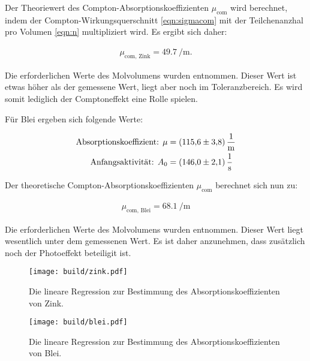 Der Theoriewert des Compton-Absorptionskoeffizienten $\mu_\text{com}$ wird berechnet, indem der Compton-Wirkungsquerschnitt \ref{eqn:sigmacom} mit der Teilchenanzhal pro Volumen \ref{eqn:n} multipliziert wird.
Es ergibt sich daher:

\begin{align*}
  \mu_\text{com, Zink} = \SI{49.7}{\per\metre}.
\end{align*}

Die erforderlichen Werte des Molvolumens wurden \cite{zink} entnommen.
Dieser Wert ist etwas höher als der gemessene Wert, liegt aber noch im Toleranzbereich.
Es wird somit lediglich der Comptoneffekt eine Rolle spielen.

Für Blei ergeben sich folgende Werte:

\begin{align*}
  \text{Absorptionskoeffizient: } \mu &= \SI{115.6 \pm 3.8}{\per\metre} \\
  \text{Anfangsaktivität: } A_0 &= \SI{146.0 \pm 2.1}{\per\second}
\end{align*}

Der theoretische Compton-Absorptionskoeffizienten $\mu_\text{com}$ berechnet sich nun zu:

\begin{align*}
  \mu_\text{com, Blei} = \SI{68.1}{\per\metre}
\end{align*}

Die erforderlichen Werte des Molvolumens wurden \cite{blei} entnommen.
Dieser Wert liegt wesentlich unter dem gemessenen Wert.
Es ist daher anzunehmen, dass zusätzlich noch der Photoeffekt beteiligit ist.

\begin{figure}
  \centering
  \texttt{[image: build/zink.pdf]}
  \caption{Die lineare Regression zur Bestimmung des Absorptionskoeffizienten von Zink.}
  \label{fig:zink1}
\end{figure}

\begin{figure}
  \centering
  \texttt{[image: build/blei.pdf]}
  \caption{Die lineare Regression zur Bestimmung des Absorptionskoeffizienten von Blei.}
  \label{fig:blei1}
\end{figure}
